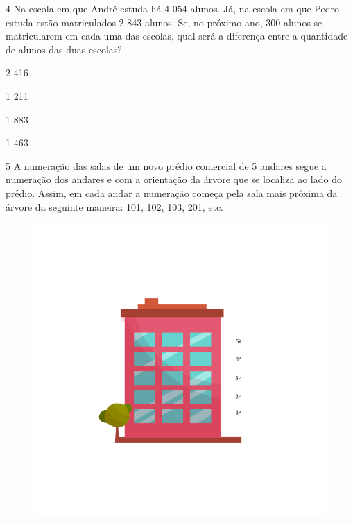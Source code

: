 \num{4} Na escola em que André estuda há 4 054 alunos. Já, na escola em que
Pedro estuda estão matriculados 2 843 alunos. Se, no próximo ano, 300
alunos se matricularem em cada uma das escolas, qual será a diferença
entre a quantidade de alunos das duas escolas?

\begin{escolha}
\item
  2 416
\item
  1 211
\item
  1 883
\item
  1 463
\end{escolha}


\num{5} A numeração das salas de um novo prédio comercial de 5 andares
segue a numeração dos andares e com a orientação da árvore que se
localiza ao lado do prédio. Assim, em cada andar a numeração começa pela
sala mais próxima da árvore da seguinte maneira: 101, 102, 103, 201,
etc.

\begin{figure}[htpb!]
\includegraphics[width=\textwidth]{../ilustracoes/MAT5/SAEB_5ANO_MAT_figura113.png}
\end{figure}

